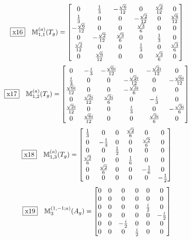 \documentclass[fleqn,10pt,landscape]{jsarticle}
\begin{document}
\begin{dmath*}
\fbox{x16}\quad \mathbb{M}_{1,1}^{(a)}(T_{g})=\begin{bmatrix} 0 & \frac{1}{3} & - \frac{\sqrt{6}}{12} & 0 & \frac{\sqrt{2}}{12} & 0 \\ \frac{1}{3} & 0 & 0 & - \frac{\sqrt{2}}{12} & 0 & \frac{\sqrt{6}}{12} \\ - \frac{\sqrt{6}}{12} & 0 & 0 & \frac{\sqrt{3}}{6} & 0 & 0 \\ 0 & - \frac{\sqrt{2}}{12} & \frac{\sqrt{3}}{6} & 0 & \frac{1}{3} & 0 \\ \frac{\sqrt{2}}{12} & 0 & 0 & \frac{1}{3} & 0 & \frac{\sqrt{3}}{6} \\ 0 & \frac{\sqrt{6}}{12} & 0 & 0 & \frac{\sqrt{3}}{6} & 0 \end{bmatrix}
\end{dmath*}
\begin{dmath*}
\fbox{x17}\quad \mathbb{M}_{1,2}^{(a)}(T_{g})=\begin{bmatrix} 0 & - \frac{i}{3} & - \frac{\sqrt{6} i}{12} & 0 & - \frac{\sqrt{2} i}{12} & 0 \\ \frac{i}{3} & 0 & 0 & - \frac{\sqrt{2} i}{12} & 0 & - \frac{\sqrt{6} i}{12} \\ \frac{\sqrt{6} i}{12} & 0 & 0 & - \frac{\sqrt{3} i}{6} & 0 & 0 \\ 0 & \frac{\sqrt{2} i}{12} & \frac{\sqrt{3} i}{6} & 0 & - \frac{i}{3} & 0 \\ \frac{\sqrt{2} i}{12} & 0 & 0 & \frac{i}{3} & 0 & - \frac{\sqrt{3} i}{6} \\ 0 & \frac{\sqrt{6} i}{12} & 0 & 0 & \frac{\sqrt{3} i}{6} & 0 \end{bmatrix}
\end{dmath*}
\begin{dmath*}
\fbox{x18}\quad \mathbb{M}_{1,3}^{(a)}(T_{g})=\begin{bmatrix} \frac{1}{3} & 0 & 0 & \frac{\sqrt{2}}{6} & 0 & 0 \\ 0 & - \frac{1}{3} & 0 & 0 & \frac{\sqrt{2}}{6} & 0 \\ 0 & 0 & \frac{1}{2} & 0 & 0 & 0 \\ \frac{\sqrt{2}}{6} & 0 & 0 & \frac{1}{6} & 0 & 0 \\ 0 & \frac{\sqrt{2}}{6} & 0 & 0 & - \frac{1}{6} & 0 \\ 0 & 0 & 0 & 0 & 0 & - \frac{1}{2} \end{bmatrix}
\end{dmath*}
\begin{dmath*}
\fbox{x19}\quad \mathbb{M}_{3}^{(1,-1;a)}(A_{g})=\begin{bmatrix} 0 & 0 & 0 & 0 & 0 & 0 \\ 0 & 0 & 0 & 0 & 0 & 0 \\ 0 & 0 & 0 & 0 & \frac{i}{2} & 0 \\ 0 & 0 & 0 & 0 & 0 & - \frac{i}{2} \\ 0 & 0 & - \frac{i}{2} & 0 & 0 & 0 \\ 0 & 0 & 0 & \frac{i}{2} & 0 & 0 \end{bmatrix}
\end{dmath*}
\end{document}
